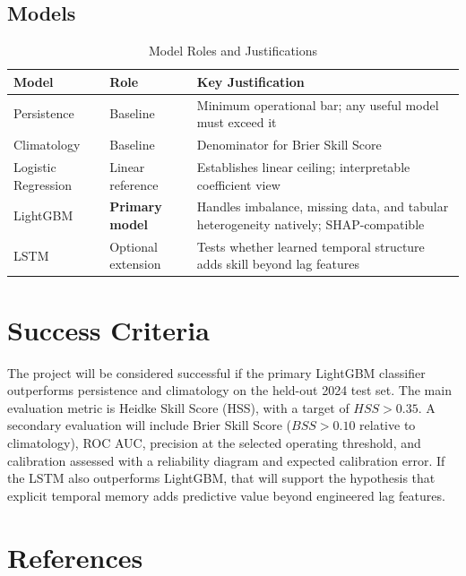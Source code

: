 \documentclass{article}
\begin{document}
\subsection*{Models}
\begin{table}[h!]
\centering
\begin{tabular}{|l|l|p{8cm}|}
\hline
\textbf{Model} & \textbf{Role} & \textbf{Key Justification} \\ \hline
Persistence & Baseline & Minimum operational bar; any useful model must exceed it \\ \hline
Climatology & Baseline & Denominator for Brier Skill Score \\ \hline
Logistic Regression & Linear reference & Establishes linear ceiling; interpretable coefficient view \\ \hline
LightGBM & \textbf{Primary model} & Handles imbalance, missing data, and tabular heterogeneity natively; SHAP-compatible \\ \hline
LSTM & Optional extension & Tests whether learned temporal structure adds skill beyond lag features \\ \hline
\end{tabular}
\caption{Model Roles and Justifications}
\end{table}

\section*{Success Criteria}
The project will be considered successful if the primary LightGBM classifier outperforms persistence and climatology on the held-out 2024 test set. The main evaluation metric is Heidke Skill Score (HSS), with a target of \(HSS > 0.35\). A secondary evaluation will include Brier Skill Score (\(BSS > 0.10\) relative to climatology), ROC AUC, precision at the selected operating threshold, and calibration assessed with a reliability diagram and expected calibration error. If the LSTM also outperforms LightGBM, that will support the hypothesis that explicit temporal memory adds predictive value beyond engineered lag features.

\newpage
\section*{References}
 
\end{document}

